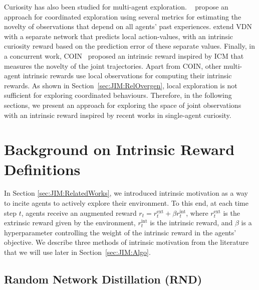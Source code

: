 Curiosity has also been studied for multi-agent exploration. ~\cite{Iqbal2019_MultiExplore} propose an approach for coordinated exploration using several metrics for estimating the novelty of observations that depend on all agents' past experiences. \cite{Zheng2021_EMC} extend VDN with a separate network that predicts local action-values, with an intrinsic curiosity reward based on the prediction error of these separate values. Finally, in a concurrent work, COIN~\citep{Li2023_COIN} proposed an intrinsic reward inspired by ICM that measures the novelty of the joint trajectories. Apart from COIN, other multi-agent intrinsic rewards use local observations for computing their intrinsic rewards. As shown in Section~\ref{sec:JIM:RelOvergen}, local exploration is not sufficient for exploring coordinated behaviours. Therefore, in the following sections, we present an approach for exploring the space of joint observations with an intrinsic reward inspired by recent works in single-agent curiosity. 









\section{Background on Intrinsic Reward Definitions}\label{sec:JIM:IntrRew}




In Section \ref{sec:JIM:RelatedWorks}, we introduced intrinsic motivation as a way to incite agents to actively explore their environment. To this end, at each time step $t$, agents receive an augmented reward $r_t=r^{\text{ext}}_t+\beta r^{\text{int}}_t$, where $r^{\text{ext}}_t$ is the extrinsic reward given by the environment, $r^{\text{int}}_t$ is the intrinsic reward, and $\beta$ is a hyperparameter controlling the weight of the intrinsic reward in the agents' objective. We describe three methods of intrinsic motivation from the literature that we will use later in Section~\ref{sec:JIM:Algo}. 




\subsection{Random Network Distillation (RND)}\label{sec:JIM:RND}

